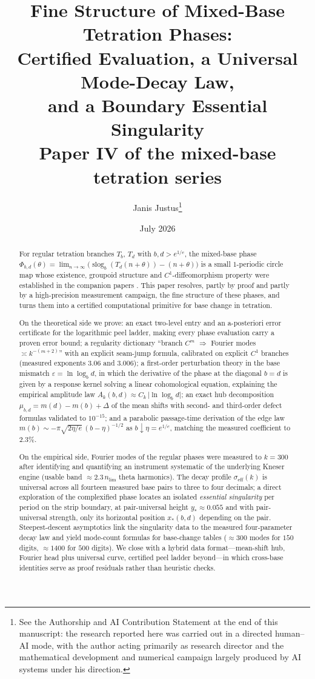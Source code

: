 \documentclass[11pt,a4paper]{article}
\title{Fine Structure of Mixed-Base Tetration Phases:\\
Certified Evaluation, a Universal Mode-Decay Law,\\
and a Boundary Essential Singularity\\[2mm]
\large Paper IV of the mixed-base tetration series}
\author{Janis Justus\thanks{See the Authorship and AI Contribution Statement at the end of this
manuscript: the research reported here was carried out in a directed human--AI mode, with the
author acting primarily as research director and the mathematical development and numerical
campaign largely produced by AI systems under his direction.}}
\date{July 2026}
\theoremstyle{definition}
\theoremstyle{remark}
\newcommand{\slog}{\operatorname{slog}}
\newcommand{\eff}{\mathrm{eff}}
\begin{document}
\maketitle

\begin{abstract}
For regular tetration branches $T_b$, $T_d$ with $b,d>e^{1/e}$, the mixed-base phase
$\Phi_{b,d}(\theta)=\lim_{n\to\infty}\bigl(\slog_b(T_d(n+\theta))-(n+\theta)\bigr)$ is a small
$1$-periodic circle map whose existence, groupoid structure and $C^1$-diffeomorphism property
were established in the companion papers \cite{phaselaw,unified}. This paper resolves, partly
by proof and partly by a high-precision measurement campaign, the fine structure of these
phases, and turns them into a certified computational primitive for base change in tetration.

On the theoretical side we prove: an exact two-level entry and an a-posteriori error
certificate for the logarithmic peel ladder, making every phase evaluation carry a proven
error bound; a regularity dictionary ``branch $C^m$ $\Rightarrow$ Fourier modes
$\asymp k^{-(m+2)}$'' with an explicit seam-jump formula, calibrated on explicit $C^1$
branches (measured exponents $3.06$ and $3.006$); a first-order perturbation theory in the
base mismatch $\varepsilon=\ln\log_b d$, in which the derivative of the phase at the diagonal
$b=d$ is given by a response kernel solving a linear cohomological equation, explaining the
empirical amplitude law $A_k(b,d)\approx C_k\,\lvert\ln\log_b d\rvert$; an exact hub
decomposition $\mu_{b,d}=m(d)-m(b)+\Delta$ of the mean shifts with second- and third-order
defect formulas validated to $10^{-15}$; and a parabolic passage-time derivation of the edge
law $m(b)\sim-\pi\sqrt{2\eta/e}\,(b-\eta)^{-1/2}$ as $b\downarrow\eta=e^{1/e}$, matching the
measured coefficient to $2.3\%$.

On the empirical side, Fourier modes of the regular phases were measured to $k=300$ after
identifying and quantifying an instrument systematic of the underlying Kneser engine
(usable band $\approx 2.3\,n_{\mathrm{lim}}$ theta harmonics). The decay profile
$\sigma_\eff(k)$ is universal across all fourteen measured base pairs to three to four
decimals; a direct exploration of the complexified phase locates an isolated
\emph{essential singularity} per period on the strip boundary, at pair-universal height
$y_*\approx 0.055$ and with pair-universal strength, only its horizontal position $x_*(b,d)$
depending on the pair. Steepest-descent asymptotics link the singularity data to the measured
four-parameter decay law and yield mode-count formulas for base-change tables
($\approx 300$ modes for $150$ digits, $\approx 1400$ for $500$ digits). We close with a
hybrid data format---mean-shift hub, Fourier head plus universal curve, certified peel ladder
beyond---in which cross-base identities serve as proof residuals rather than heuristic checks.
\end{abstract}
\end{document}
